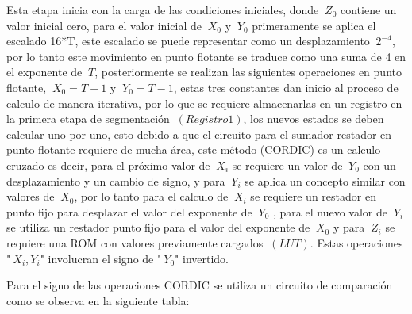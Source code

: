 Esta etapa inicia con la carga de las condiciones iniciales, donde $\ Z_0 $ contiene un valor inicial cero, para el valor inicial de $\ X_0 $ y $\ Y_0 $ primeramente se aplica el escalado  16*T,
este escalado se puede representar como un desplazamiento $\ 2^{-4} $, por lo tanto este movimiento en punto flotante se traduce como una suma de 4 en el exponente de $\ T$, posteriormente se realizan las siguientes operaciones en punto flotante,  $\ X_0 = T + 1 $ y $\ Y_0 = T - 1 $, estas tres constantes dan inicio al proceso de calculo de manera iterativa, por lo que se requiere almacenarlas en un registro en la primera etapa de segmentación $\ \left(Registro 1 \right) $, los nuevos estados se deben calcular uno por uno, esto debido a que el circuito para el sumador-restador en punto flotante requiere de mucha área, este método (CORDIC) es un calculo cruzado es decir, para el próximo valor de $\ X_i$ se requiere un valor de $\ Y_0 $ con un desplazamiento y un cambio de signo, y para $\ Y_i $ se aplica un concepto similar con valores de $\ X_0$,  por lo tanto para el calculo de $\ X_i $ se requiere un restador en punto fijo para desplazar el valor del exponente de $\ Y_0 $ , para el nuevo valor de $\ Y_i $ se utiliza un restador punto fijo para el valor del exponente de $\ X_0 $ y para $\ Z_i $ se requiere una ROM con valores previamente cargados $\ \left(LUT \right) $. Estas operaciones "$\ X_i , Y_i $"  involucran el signo de "$\ Y_0 $" invertido.

Para el signo de las operaciones CORDIC se utiliza un circuito de comparación como se observa en la siguiente tabla: 

